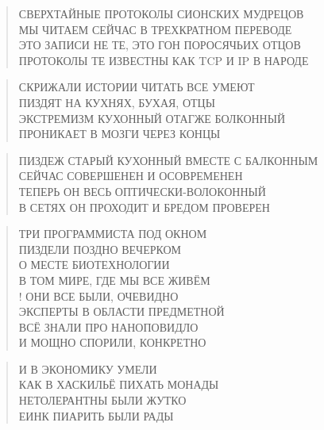 \poemtitle{***}
\begin{verse}
СВЕРХТАЙНЫЕ ПРОТОКОЛЫ СИОНСКИХ МУДРЕЦОВ\\
МЫ ЧИТАЕМ СЕЙЧАС В ТРЕХКРАТНОМ ПЕРЕВОДЕ\\
ЭТО ЗАПИСИ НЕ ТЕ, ЭТО ГОН ПОРОСЯЧЬИХ ОТЦОВ\\
ПРОТОКОЛЫ ТЕ ИЗВЕСТНЫ КАК TCP И IP В НАРОДЕ
\end{verse}

\poemtitle{***}
\begin{verse}
СКРИЖАЛИ ИСТОРИИ ЧИТАТЬ ВСЕ УМЕЮТ\\
ПИЗДЯТ НА КУХНЯХ, БУХАЯ, ОТЦЫ\\
ЭКСТРЕМИЗМ КУХОННЫЙ ОТАГЖЕ БОЛКОННЫЙ\\
ПРОНИКАЕТ В МОЗГИ ЧЕРЕЗ КОНЦЫ
\end{verse}

\poemtitle{***}
\begin{verse}
ПИЗДЕЖ СТАРЫЙ КУХОННЫЙ ВМЕСТЕ С БАЛКОННЫМ\\
СЕЙЧАС СОВЕРШЕНЕН И ОСОВРЕМЕНЕН\\
ТЕПЕРЬ ОН ВЕСЬ ОПТИЧЕСКИ-ВОЛОКОННЫЙ\\
В СЕТЯХ ОН ПРОХОДИТ И БРЕДОМ ПРОВЕРЕН
\end{verse}

\poemtitle{***}
\begin{verse}
ТРИ ПРОГРАММИСТА ПОД ОКНОМ\\
ПИЗДЕЛИ ПОЗДНО ВЕЧЕРКОМ\\
О МЕСТЕ БИОТЕХНОЛОГИИ\\
В ТОМ МИРЕ, ГДЕ МЫ ВСЕ ЖИВЁМ\\!
ОНИ ВСЕ БЫЛИ, ОЧЕВИДНО\\
ЭКСПЕРТЫ В ОБЛАСТИ ПРЕДМЕТНОЙ\\
ВСЁ ЗНАЛИ ПРО НАНОПОВИДЛО\\
И МОЩНО СПОРИЛИ, КОНКРЕТНО
\end{verse}

\poemtitle{***}
\begin{verse}
И В ЭКОНОМИКУ УМЕЛИ\\
КАК В ХАСКИЛЬЁ ПИХАТЬ МОНАДЫ\\
НЕТОЛЕРАНТНЫ БЫЛИ ЖУТКО\\
ЕИНК ПИАРИТЬ БЫЛИ РАДЫ
\end{verse}

